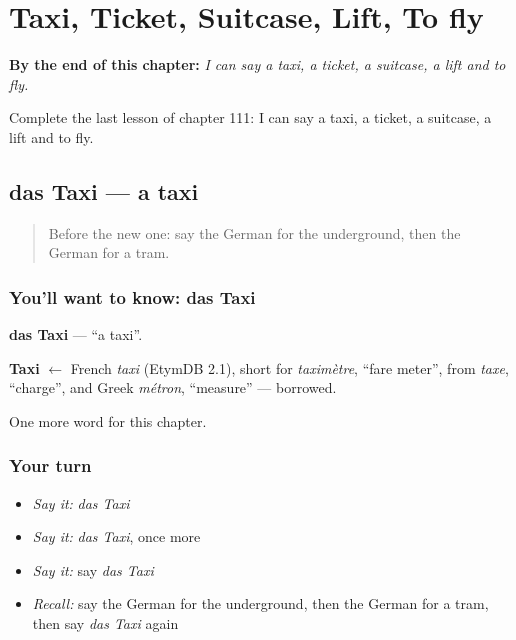 
\chapter{Taxi, Ticket, Suitcase, Lift, To fly}
\label{ch:ge-taxi-ticket-suitcase-lift-to-fly}

\begin{chapteropening}
\textbf{By the end of this chapter:} \emph{I can say a taxi, a ticket, a suitcase, a lift and to fly.}

Complete the last lesson of chapter 111: I can say a taxi, a ticket, a suitcase, a lift and to fly.
\end{chapteropening}

\section[das Taxi]{das Taxi — a taxi}

\label{lesson:GE-C111-taxi}



\begin{quote}
Before the new one: say the German for the underground, then the German for a tram.
\end{quote}

\subsection*{You'll want to know: das Taxi}
\textbf{das Taxi} — \textquotedblleft{}a taxi\textquotedblright{}.

\begin{cousinweb}
\textbf{Taxi} $\leftarrow$ French \emph{taxi} (EtymDB 2.1), short for \emph{taximètre}, \textquotedblleft{}fare meter\textquotedblright{}, from \emph{taxe}, \textquotedblleft{}charge\textquotedblright{}, and Greek \emph{métron}, \textquotedblleft{}measure\textquotedblright{} — borrowed.
\end{cousinweb}

\begin{grammarlens}[title={What you've built}]
One more word for this chapter.
\end{grammarlens}

\subsection*{Your turn}
\begin{itemize}
\raggedright
  \item \emph{Say it:} \emph{das Taxi}
  \item \emph{Say it:} \emph{das Taxi}, once more
  \item \emph{Say it:} say \emph{das Taxi}
  \item \emph{Recall:} say the German for the underground, then the German for a tram, then say \emph{das Taxi} again
\end{itemize}

